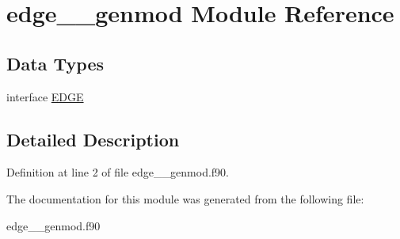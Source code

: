\hypertarget{classedge____genmod}{\section{edge\+\_\+\+\_\+genmod Module Reference}
\label{classedge____genmod}
}
\subsection*{Data Types}
\begin{DoxyCompactItemize}
\item 
interface \hyperlink{interfaceedge____genmod_1_1_e_d_g_e}{E\+D\+G\+E}
\end{DoxyCompactItemize}


\subsection{Detailed Description}


Definition at line 2 of file edge\+\_\+\+\_\+genmod.\+f90.



The documentation for this module was generated from the following file\+:\begin{DoxyCompactItemize}
\item 
edge\+\_\+\+\_\+genmod.\+f90\end{DoxyCompactItemize}
